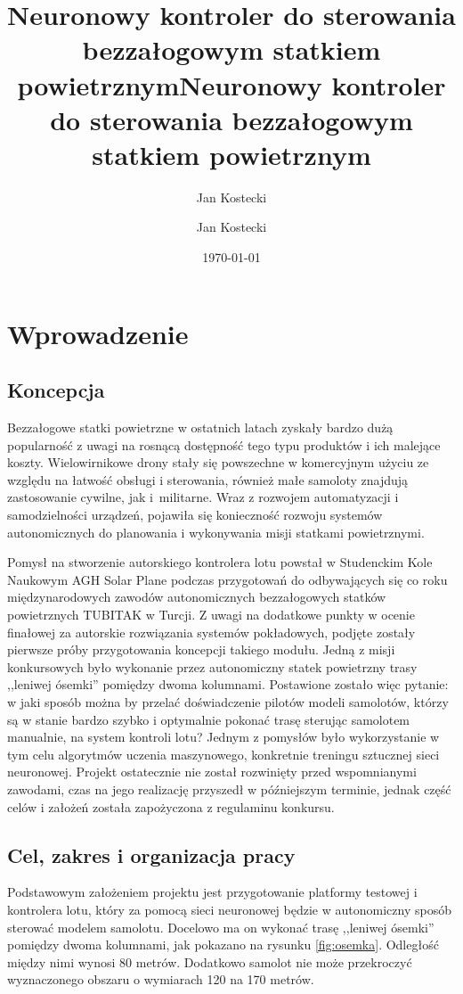\documentclass[12pt, a4paper]{article}
\title{Neuronowy kontroler do sterowania bezzałogowym statkiem powietrznym}
\author{Jan Kostecki}
\title{Neuronowy kontroler do sterowania bezzałogowym statkiem powietrznym}
\author{Jan Kostecki}
\date{\today}
\begin{document}
\onehalfspacing


\newpage
\tableofcontents

\clearpage

\section{Wprowadzenie}
\subsection{Koncepcja}

Bezzałogowe statki powietrzne w ostatnich latach zyskały bardzo dużą popularność z uwagi na rosnącą dostępność tego typu produktów i ich malejące koszty. Wielowirnikowe drony stały się powszechne w komercyjnym użyciu ze względu na łatwość obsługi i sterowania, również małe samoloty znajdują zastosowanie cywilne, jak i~militarne. Wraz z rozwojem automatyzacji i samodzielności urządzeń, pojawiła się konieczność rozwoju systemów autonomicznych do planowania i wykonywania misji statkami powietrznymi.

Pomysł na stworzenie autorskiego kontrolera lotu powstał w Studenckim Kole Naukowym AGH Solar Plane podczas przygotowań do odbywających się co roku międzynarodowych zawodów autonomicznych bezzałogowych statków powietrznych TUBITAK w Turcji. Z uwagi na dodatkowe punkty w ocenie finałowej za autorskie rozwiązania systemów pokładowych, podjęte zostały pierwsze próby przygotowania koncepcji takiego modułu. Jedną z misji konkursowych było wykonanie przez autonomiczny statek powietrzny trasy ,,leniwej ósemki'' pomiędzy dwoma kolumnami. Postawione zostało więc pytanie: w jaki sposób można by przelać doświadczenie pilotów modeli samolotów, którzy są w stanie bardzo szybko i optymalnie pokonać trasę sterując samolotem manualnie, na system kontroli lotu? Jednym z pomysłów było wykorzystanie w tym celu algorytmów uczenia maszynowego, konkretnie treningu sztucznej sieci neuronowej. Projekt ostatecznie nie został rozwinięty przed wspomnianymi zawodami, czas na jego realizację przyszedł w późniejszym terminie, jednak część celów i założeń została zapożyczona z regulaminu konkursu.

\subsection{Cel, zakres i organizacja pracy}
Podstawowym założeniem projektu jest przygotowanie platformy testowej i kontrolera lotu, który za pomocą sieci neuronowej będzie w autonomiczny sposób sterować modelem samolotu. Docelowo ma on wykonać trasę ,,leniwej ósemki'' pomiędzy dwoma kolumnami, jak pokazano na rysunku \ref{fig:osemka}. Odległość między nimi wynosi 80 metrów. Dodatkowo samolot nie może przekroczyć wyznaczonego obszaru o wymiarach 120 na 170 metrów.
\end{document}
